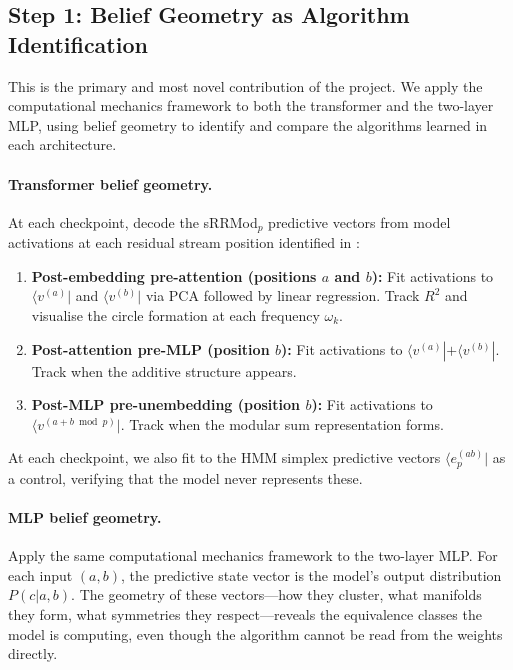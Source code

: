 \documentclass[11pt,a4paper]{article}
\begin{document}
\subsection{Step 1: Belief Geometry as Algorithm Identification}\label{sec:belief}

This is the primary and most novel contribution of the project. We apply the computational mechanics framework to both the transformer and the two-layer MLP, using belief geometry to identify and compare the algorithms learned in each architecture.

\paragraph{Transformer belief geometry.} At each checkpoint, decode the sRRMod$_p$ predictive vectors from model activations at each residual stream position identified in \citet{poncini2025compmech}:
\begin{enumerate}[label=(\alph*)]
    \item \textbf{Post-embedding pre-attention (positions $a$ and $b$):} Fit activations to $\langle v^{(a)}|$ and $\langle v^{(b)}|$ via PCA followed by linear regression. Track $R^2$ and visualise the circle formation at each frequency $\omega_k$.
    \item \textbf{Post-attention pre-MLP (position $b$):} Fit activations to $\langle v^{(a)}| + \langle v^{(b)}|$. Track when the additive structure appears.
    \item \textbf{Post-MLP pre-unembedding (position $b$):} Fit activations to $\langle v^{(a+b \bmod p)}|$. Track when the modular sum representation forms.
\end{enumerate}

At each checkpoint, we also fit to the HMM simplex predictive vectors $\langle e_p^{(ab)}|$ as a control, verifying that the model never represents these.

\paragraph{MLP belief geometry.} Apply the same computational mechanics framework to the two-layer MLP. For each input $(a, b)$, the predictive state vector is the model's output distribution $P(c | a, b)$. The geometry of these vectors---how they cluster, what manifolds they form, what symmetries they respect---reveals the equivalence classes the model is computing, even though the algorithm cannot be read from the weights directly.
\end{document}
